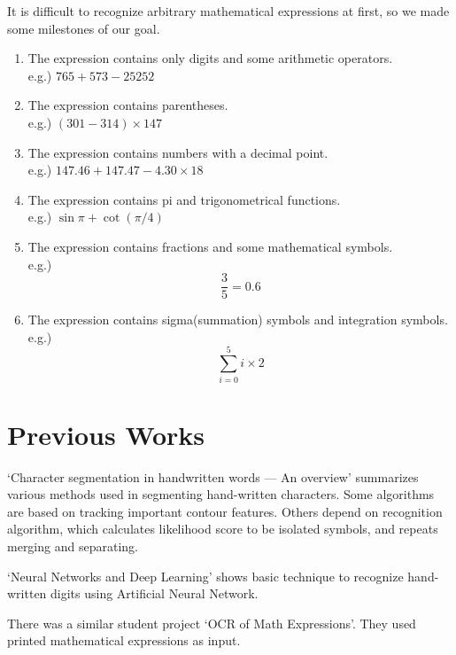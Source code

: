 \documentclass[10pt,twocolumn,letterpaper]{article}
\begin{document}
It is difficult to recognize arbitrary mathematical expressions at first, so we made some milestones of our goal.

\begin{enumerate}
\item The expression contains only digits and some arithmetic operators. \\
e.g.) $765+573-25252$

\item The expression contains parentheses. \\
e.g.) $(301-314)\times 147$

\item The expression contains numbers with a decimal point. \\
e.g.) $147.46 + 147.47 - 4.30 \times 18$

\item The expression contains pi and trigonometrical functions. \\
e.g.) $\sin \pi + \cot (\pi / 4)$

\item The expression contains fractions and some mathematical symbols. \\
e.g.) $$ \frac{3}{5} = 0.6 $$

\item The expression contains sigma(summation) symbols and integration symbols. \\
e.g.) $$ \sum_{i=0}^{5} i \times 2 $$

\end{enumerate}

\section{Previous Works}
`Character segmentation in handwritten words — An overview'
\cite{Lu199677} summarizes various methods used in segmenting hand-written characters.
Some algorithms are based on tracking important contour features.
Others depend on recognition algorithm,
which calculates likelihood score to be isolated symbols,
and repeats merging and separating.

`Neural Networks and Deep Learning' \cite{MichaelNielsen} shows basic technique to recognize hand-written digits using Artificial Neural Network.

There was a similar student project `OCR of Math Expressions'\cite{OCRMATH}.
They used printed mathematical expressions as input.

\end{document}
